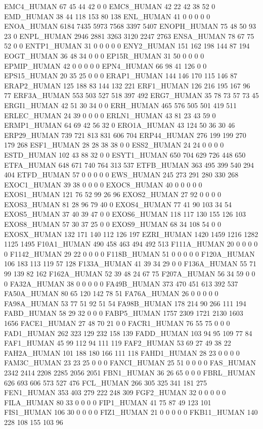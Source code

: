 EMC4_HUMAN	67	45	44	42	0	0
EMC8_HUMAN	42	22	42	38	52	0
EMD_HUMAN	38	44	118	153	80	138
ENL_HUMAN	41	0	0	0	0	0
ENOA_HUMAN	6184	7435	5973	7568	3397	5407
ENOPH_HUMAN	75	48	50	93	23	0
ENPL_HUMAN	2946	2881	3263	3120	2247	2763
ENSA_HUMAN	78	67	75	52	0	0
ENTP1_HUMAN	31	0	0	0	0	0
ENY2_HUMAN	151	162	198	144	87	194
EOGT_HUMAN	36	48	34	0	0	0
EP15R_HUMAN	31	50	0	0	0	0
EPMIP_HUMAN	42	0	0	0	0	0
EPN4_HUMAN	66	98	41	126	0	0
EPS15_HUMAN	20	35	25	0	0	0
ERAP1_HUMAN	144	146	170	115	146	87
ERAP2_HUMAN	125	188	83	144	132	221
ERF1_HUMAN	126	216	195	167	96	77
ERF3A_HUMAN	553	503	527	518	397	492
ERG7_HUMAN	35	78	73	57	73	45
ERGI1_HUMAN	42	51	30	34	0	0
ERH_HUMAN	465	576	505	501	419	511
ERLEC_HUMAN	24	39	0	0	0	0
ERLN1_HUMAN	43	81	23	43	59	0
ERMP1_HUMAN	64	69	42	56	32	0
ERO1A_HUMAN	43	124	50	36	30	46
ERP29_HUMAN	739	721	813	831	606	704
ERP44_HUMAN	276	199	199	270	179	268
ESF1_HUMAN	28	28	38	38	0	0
ESS2_HUMAN	24	24	0	0	0	0
ESTD_HUMAN	102	43	88	32	0	0
ESYT1_HUMAN	650	704	629	726	448	650
ETFA_HUMAN	648	671	740	764	313	537
ETFB_HUMAN	363	495	399	540	294	404
ETFD_HUMAN	57	0	0	0	0	0
EWS_HUMAN	245	273	291	280	330	268
EXOC1_HUMAN	39	38	0	0	0	0
EXOC8_HUMAN	40	0	0	0	0	0
EXOS1_HUMAN	121	76	52	99	26	96
EXOS2_HUMAN	27	92	0	0	0	0
EXOS3_HUMAN	81	28	96	79	40	0
EXOS4_HUMAN	77	41	90	103	34	54
EXOS5_HUMAN	37	40	39	47	0	0
EXOS6_HUMAN	118	117	130	155	126	103
EXOS8_HUMAN	57	30	37	25	0	0
EXOS9_HUMAN	68	34	108	54	0	0
EXOSX_HUMAN	132	171	140	112	126	197
EZRI_HUMAN	1420	1459	1216	1282	1125	1495
F10A1_HUMAN	490	458	463	494	492	513
F111A_HUMAN	20	0	0	0	0	0
F1142_HUMAN	29	22	0	0	0	0
F118B_HUMAN	51	0	0	0	0	0
F120A_HUMAN	106	183	113	119	57	128
F133A_HUMAN	41	39	34	29	0	0
F136A_HUMAN	55	71	99	139	82	162
F162A_HUMAN	52	39	48	24	67	75
F207A_HUMAN	56	34	59	0	0	0
FA32A_HUMAN	38	0	0	0	0	0
FA49B_HUMAN	373	470	451	613	392	537
FA50A_HUMAN	80	65	120	142	78	51
FA76A_HUMAN	26	0	0	0	0	0
FA98A_HUMAN	53	77	51	92	51	54
FA98B_HUMAN	178	214	90	266	111	194
FABD_HUMAN	58	29	32	0	0	0
FABP5_HUMAN	1757	2309	1721	2130	1603	1656
FACE1_HUMAN	27	48	70	21	0	0
FACR1_HUMAN	76	55	75	0	0	0
FAD1_HUMAN	262	323	129	232	158	139
FADD_HUMAN	103	94	95	109	77	84
FAF1_HUMAN	45	99	112	94	111	119
FAF2_HUMAN	53	69	27	49	38	22
FAH2A_HUMAN	101	188	180	166	111	118
FAHD1_HUMAN	28	23	0	0	0	0
FAM3C_HUMAN	23	23	25	0	0	0
FANCI_HUMAN	25	51	0	0	0	0
FAS_HUMAN	2342	2414	2208	2285	2056	2051
FBN1_HUMAN	36	26	65	0	0	0
FBRL_HUMAN	626	693	606	573	527	476
FCL_HUMAN	266	305	325	341	181	275
FEN1_HUMAN	353	403	279	222	248	309
FGF2_HUMAN	32	0	0	0	0	0
FILA_HUMAN	80	33	0	0	0	0
FIP1_HUMAN	41	75	87	49	123	101
FIS1_HUMAN	106	30	0	0	0	0
FIZ1_HUMAN	21	0	0	0	0	0
FKB11_HUMAN	140	228	108	155	103	96
